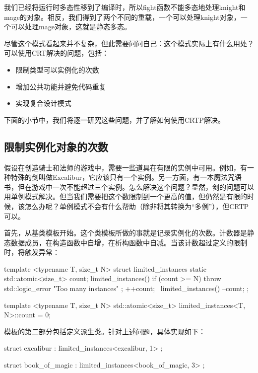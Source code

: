 我们已经将运行时多态性移到了编译时，所以fight函数不能多态地处理knight和mage的对象。相反，我们得到了两个不同的重载，一个可以处理knight对象，一个可以处理mage对象，这就是静态多态。

尽管这个模式看起来并不复杂，但此需要问问自己：这个模式实际上有什么用处？可以使用CRT解决的问题，包括：

\begin{itemize}
\item
限制类型可以实例化的次数

\item
增加公共功能并避免代码重复

\item
实现复合设计模式
\end{itemize}

下面的小节中，我们将逐一研究这些问题，并了解如何使用CRTP解决。

\subsection{限制实例化对象的次数}

假设在创造骑士和法师的游戏中，需要一些道具在有限的实例中可用。例如，有一种特殊的剑叫做Excalibur，它应该只有一个实例。另一方面，有一本魔法咒语书，但在游戏中一次不能超过三个实例。怎么解决这个问题？显然，剑的问题可以用单例模式解决。但当我们需要把这个数限制到一个更高的值，但仍然是有限的时候，该怎么办呢？单例模式不会有什么帮助（除非将其转换为“多例”），但CRTP可以。

首先，从基类模板开始。这个类模板所做的事就是记录实例化的次数。计数器是静态数据成员，在构造函数中自增，在析构函数中自减。当该计数超过定义的限制时，将触发异常：

\begin{cpp}
template <typename T, size_t N>
struct limited_instances
{
	static std::atomic<size_t> count;
	limited_instances()
	{
		if (count >= N)
			throw std::logic_error{ "Too many instances" };
		++count;
	}
	~limited_instances() { --count; }
};

template <typename T, size_t N>
std::atomic<size_t> limited_instances<T, N>::count = 0;
\end{cpp}

模板的第二部分包括定义派生类。针对上述问题，具体实现如下：

\begin{cpp}
struct excalibur : limited_instances<excalibur, 1>
{};

struct book_of_magic : limited_instances<book_of_magic, 3>
{};
\end{cpp}

